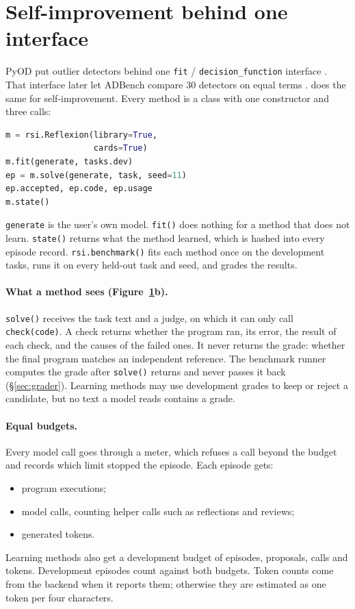 \section{Self-improvement behind one interface}
\label{sec:methods}

PyOD put outlier detectors behind one \texttt{fit} / \texttt{decision\_function} interface
\citep{zhao2019pyod}. That interface later let ADBench compare 30 detectors on equal terms
\citep{han2022adbench}. \lib{} does the same for self-improvement. Every method is a class
with one constructor and three calls:
\begin{lstlisting}[language=Python]
m = rsi.Reflexion(library=True,
                  cards=True)
m.fit(generate, tasks.dev)
ep = m.solve(generate, task, seed=11)
ep.accepted, ep.code, ep.usage
m.state()
\end{lstlisting}
\texttt{generate} is the user's own model. \texttt{fit()} does nothing for a method that does
not learn. \texttt{state()} returns what the method learned,
which is hashed into every episode record. \texttt{rsi.benchmark()} fits each method once on
the development tasks, runs it on every held-out task and seed, and grades the results.

\begin{figure}[t]
\centering

\caption{\EpisodeCaption}
\label{fig:episode}
\end{figure}

\paragraph{What a method sees (Figure~\ref{fig:episode}b).}
\texttt{solve()} receives the task text and a judge, on which it can only call
\texttt{check(code)}. A check returns whether the program ran, its error, the result of each
check, and the causes of the failed ones. It never returns the grade: whether the final
program matches an independent reference. The benchmark runner computes the grade after
\texttt{solve()} returns and never passes it back (\S\ref{sec:grader}). Learning methods may
use development grades to keep or reject a candidate, but no text a model reads contains a
grade.

\paragraph{Equal budgets.}
Every model call goes through a meter, which refuses a call beyond the budget and records
which limit stopped the episode. Each episode gets:
\begin{itemize}
\item \BudgetAttempts{} program executions;
\item \BudgetCalls{} model calls, counting helper calls such as reflections and reviews;
\item \BudgetTokens{} generated tokens.
\end{itemize}
Learning methods also get a development budget of \FitEpisodes{} episodes, \FitProposals{}
proposals, \FitCalls{} calls and \FitTokens{} tokens. Development episodes count against
both budgets. Token counts come from the backend when it reports them; otherwise they are
estimated as one token per four characters.


